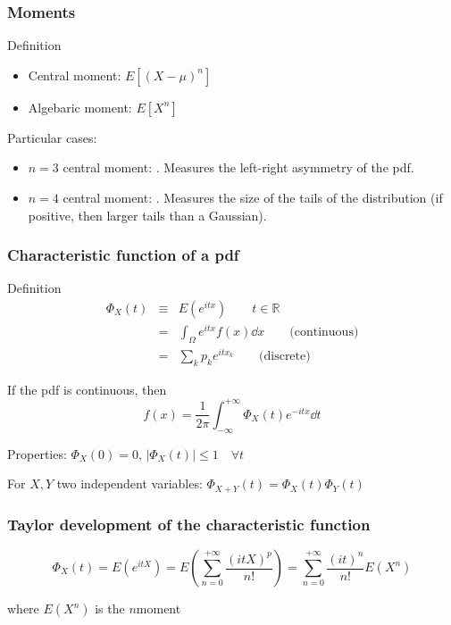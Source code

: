 \documentclass[9pt]{beamer}
\begin{document}
\begin{frame}
 \frametitle{Moments}
 
 \begin{block}{Definition}
  \begin{itemize}
   \item Central moment: $E\left[ (X-\mu)^n \right]$
   \item Algebaric moment: $E\left[ X^n \right]$
  \end{itemize}

 \end{block}

 Particular cases: 
 
 \begin{itemize}
  \item $n=3$ central moment: . Measures the left-right asymmetry of the pdf.
  \item $n=4$ central moment: . Measures the size of the tails of the distribution (if positive, then larger tails than a Gaussian).
 \end{itemize}

 
\end{frame}

\begin{frame}
 \frametitle{Characteristic function of a pdf}
 
 \begin{block}{Definition}
  \begin{eqnarray}
   \Phi_X (t) & \equiv & E(e^{itx}) \qquad t \in \mathbb{R} \nonumber \\
   & = & \int_\Omega e^{itx} f(x) \dd x \qquad \text{(continuous)}\nonumber \\
   & = & \sum_k p_k e^{i t x_k}\qquad \text{(discrete)} \nonumber 
  \end{eqnarray}

 \end{block}
 
 If the pdf is continuous, then 
 $$f(x) = \frac{1}{2 \pi} \int_{-\infty}^{+\infty} \Phi_X(t) e^{-itx} \dd t$$
 
 Properties: $\Phi_X (0) = 0$, $|\Phi_X(t)| \leq 1 \quad \forall t$
 
 For $X,Y$ two independent variables: $\Phi_{X+Y}(t) = \Phi_X(t) \Phi_Y(t)$


\end{frame}

\begin{frame}
 \frametitle{Taylor development of the characteristic function}
 
 \begin{block}{}
  $$\Phi_X(t) = E(e^{itX}) = E \left( \sum_{n=0}^{+\infty} \frac{(itX)^p}{n!} \right) = \sum_{n=0}^{+\infty} \frac{(it)^n}{n!} E(X^n) $$
  
  where $E(X^n)$ is the $n$\ith moment
 \end{block}
 

\end{frame}
\end{document}
